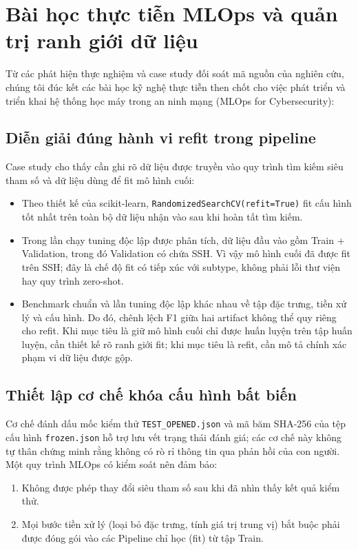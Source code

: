 
\section{Bài học thực tiễn MLOps và quản trị ranh giới dữ liệu}

Từ các phát hiện thực nghiệm và case study đối soát mã nguồn của nghiên cứu, chúng tôi đúc kết các bài học kỹ nghệ thực tiễn then chốt cho việc phát triển và triển khai hệ thống học máy trong an ninh mạng (MLOps for Cybersecurity):

\subsection{Diễn giải đúng hành vi refit trong pipeline}
Case study cho thấy cần ghi rõ dữ liệu được truyền vào quy trình tìm kiếm siêu tham số và dữ liệu dùng để fit mô hình cuối:
\begin{itemize}
    \item Theo thiết kế của scikit-learn, \texttt{RandomizedSearchCV(refit=True)} fit cấu hình tốt nhất trên toàn bộ dữ liệu nhận vào sau khi hoàn tất tìm kiếm.
    \item Trong lần chạy tuning độc lập được phân tích, dữ liệu đầu vào gồm Train + Validation, trong đó Validation có chứa SSH. Vì vậy mô hình cuối đã được fit trên SSH; đây là chế độ fit có tiếp xúc với subtype, không phải lỗi thư viện hay quy trình zero-shot.
    \item Benchmark chuẩn và lần tuning độc lập khác nhau về tập đặc trưng, tiền xử lý và cấu hình. Do đó, chênh lệch F1 giữa hai artifact không thể quy riêng cho refit. Khi mục tiêu là giữ mô hình cuối chỉ được huấn luyện trên tập huấn luyện, cần thiết kế rõ ranh giới fit; khi mục tiêu là refit, cần mô tả chính xác phạm vi dữ liệu được gộp.
\end{itemize}

\subsection{Thiết lập cơ chế khóa cấu hình bất biến}
Cơ chế đánh dấu mốc kiểm thử \texttt{TEST\_OPENED.json} và mã băm SHA-256 của tệp cấu hình \texttt{frozen.json} hỗ trợ lưu vết trạng thái đánh giá; các cơ chế này không tự thân chứng minh rằng không có rò rỉ thông tin qua phản hồi của con người. Một quy trình MLOps có kiểm soát nên đảm bảo:
\begin{enumerate}
    \item Không được phép thay đổi siêu tham số sau khi đã nhìn thấy kết quả kiểm thử.
    \item Mọi bước tiền xử lý (loại bỏ đặc trưng, tính giá trị trung vị) bắt buộc phải được đóng gói vào các Pipeline chỉ học (fit) từ tập Train.
\end{enumerate}

